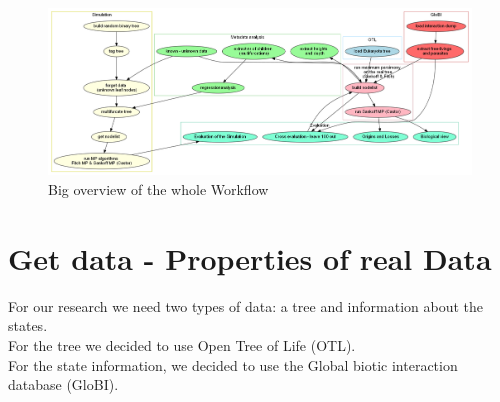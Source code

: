   \begin{figure}[h!]
    \centering
    \includegraphics[width=1\textwidth]{Figures/Workflow.png}
    \caption{Big overview of the whole Workflow}
    \label{fig:Workflow}
  \end{figure}

  \section{Get data - Properties of real Data}
    For our research we need two types of data: a tree and information about the states. \\
    For the tree we decided to use Open Tree of Life (OTL). \\
    For the state information, we decided to use the Global biotic interaction database (GloBI).

